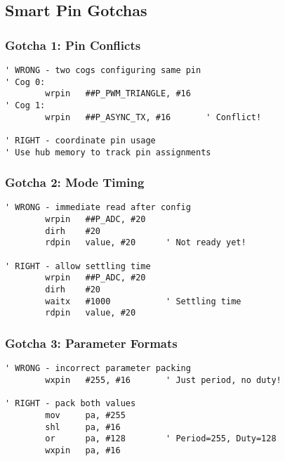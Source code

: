 \documentclass[11pt]{book}
\begin{document}
\hypertarget{smart-pin-gotchas}{%
\subsection{Smart Pin Gotchas}\label{smart-pin-gotchas}}

\hypertarget{gotcha-1-pin-conflicts}{%
\subsubsection{Gotcha 1: Pin Conflicts}\label{gotcha-1-pin-conflicts}}

\begin{lstlisting}
' WRONG - two cogs configuring same pin
' Cog 0:
        wrpin   ##P_PWM_TRIANGLE, #16
' Cog 1:
        wrpin   ##P_ASYNC_TX, #16       ' Conflict!
        
' RIGHT - coordinate pin usage
' Use hub memory to track pin assignments
\end{lstlisting}

\hypertarget{gotcha-2-mode-timing}{%
\subsubsection{Gotcha 2: Mode Timing}\label{gotcha-2-mode-timing}}

\begin{lstlisting}
' WRONG - immediate read after config
        wrpin   ##P_ADC, #20
        dirh    #20
        rdpin   value, #20      ' Not ready yet!
        
' RIGHT - allow settling time
        wrpin   ##P_ADC, #20
        dirh    #20
        waitx   #1000           ' Settling time
        rdpin   value, #20
\end{lstlisting}

\hypertarget{gotcha-3-parameter-formats}{%
\subsubsection{Gotcha 3: Parameter
Formats}\label{gotcha-3-parameter-formats}}

\begin{lstlisting}
' WRONG - incorrect parameter packing
        wxpin   #255, #16       ' Just period, no duty!
        
' RIGHT - pack both values
        mov     pa, #255
        shl     pa, #16
        or      pa, #128        ' Period=255, Duty=128
        wxpin   pa, #16
\end{lstlisting}
\end{document}
